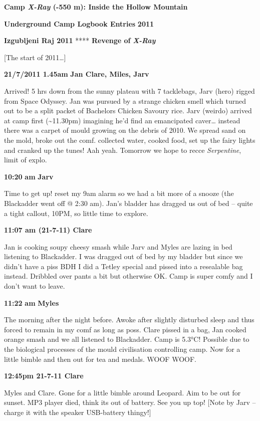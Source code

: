 \textbf{Camp \emph{X-Ray} (-550 m): Inside the Hollow Mountain}

\textbf{Underground Camp Logbook Entries} \textbf{2011}



\textbf{Izgubljeni Raj 2011} **** \textbf{Revenge of}
\textbf{\emph{X-Ray}}

{[}The start of 2011\ldots{}{]}

\textbf{21/7/2011 1.45am} \textbf{Jan Clare, Miles, Jarv}

Arrived! 5 hrs down from the sunny plateau with 7 tacklebags, Jarv
(hero) rigged from Space Odyssey. Jan was pursued by a strange chicken
smell which turned out to be a split packet of Bachelors Chicken Savoury
rice. Jarv (weirdo) arrived at camp first (\textasciitilde 11.30pm)
imagining he'd find an emancipated caver\ldots{} instead there was a
carpet of mould growing on the debris of 2010. We spread sand on the
mold, broke out the comf. collected water, cooked food, set up the fairy
lights and cranked up the tunes! Aah yeah. Tomorrow we hope to recce
\emph{Serpentine}, limit of explo.

\textbf{10:20} \textbf{am} \textbf{Jarv}

Time to get up! reset my 9am alarm so we had a bit more of a snooze (the
Blackadder went off @ 2:30 am). Jan's bladder has dragged us out of bed
-- quite a tight callout, 10PM, so little time to explore.

\textbf{11:07 am (21-7-11) Clare}

Jan is cooking soupy cheesy smash while Jarv and Myles are lazing in bed
listening to Blackadder. I was dragged out of bed by my bladder but
since we didn't have a piss BDH I did a Tetley special and pissed into a
resealable bag instead. Dribbled over pants a bit but otherwise OK. Camp
is super comfy and I don't want to leave.

\textbf{11:22} \textbf{am} \textbf{Myles}

The morning after the night before. Awoke after slightly disturbed sleep
and thus forced to remain in my comf as long as poss. Clare pissed in a
bag, Jan cooked orange smash and we all listened to Blackadder. Camp is
5.3°C! Possible due to the biological processes of the mould
civilisation controlling camp. Now for a little bimble and then out for
tea and medals. WOOF WOOF.

\textbf{12:45pm 21-7-11 Clare}

Myles and Clare. Gone for a little bimble around Leopard. Aim to be out
for sunset. MP3 player died, think its out of battery. See you up top!
{[}Note by Jarv -- charge it with the speaker USB-battery thingy!{]}

